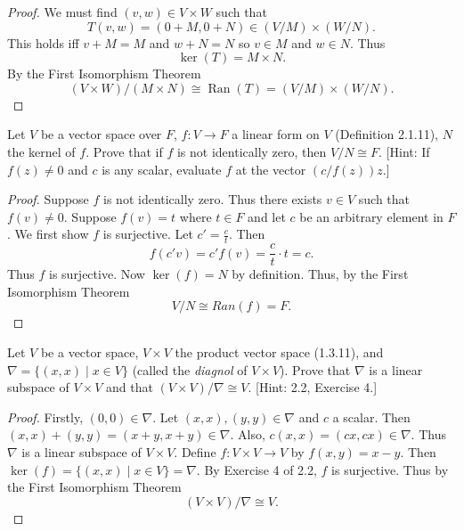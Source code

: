 \begin{proof}
    We must find $(v, w) \in V \times W$ such that 
    \[
        T(v, w) = (0 + M, 0 + N) \in (V / M) \times (W / N).
    \]
    This holds iff $v + M = M$ and $w + N = N$ so
    $v \in M$ and $w \in N$. Thus
    \[
        \ker(T) = M \times N.
    \]
    By the First Isomorphism Theorem
    \[
        (V \times W) / (M \times N) \cong \operatorname{Ran}(T) = (V / M) \times (W / N).
    \]
\end{proof}


\begin{tcolorbox}[title=Problem 3, breakable]
    Let $V$ be a vector space over $F$, $f : V \longrightarrow F$ a linear form on $V$ (Definition 2.1.11),
    $N$ the kernel of $f$. Prove that if $f$ is not identically zero, then $V / N \cong F$.
    [Hint: If $f(z) \ne 0$ and $c$ is any scalar, evaluate $f$ at the vector $(c / f(z))z$.]
\end{tcolorbox}

\begin{proof}
    Suppose $f$ is not identically zero.
    Thus there exists $v \in V$ such that $f(v) \ne 0$.
    Suppose $f(v) = t$ where $t \in F$ and let $c$ be an arbitrary element in $F$.
    We first show $f$ is surjective.
    Let $c' = \frac{c}{t}$. Then
    \[
        f(c'v) = c' f(v) = \frac{c}{t} \cdot t = c.
    \]
    Thus $f$ is surjective.
    Now $\ker(f) = N$ by definition. Thus, by the First Isomorphism Theorem
    \[
        V/N \cong Ran(f) = F.
    \]
\end{proof}

\begin{tcolorbox}[title=Problem 4, breakable]
    Let $V$ be a vector space, $V \times V$ the product vector space (1.3.11),
    and $\nabla = \{(x, x) \mid x \in V\}$ (called the \emph{diagnol} of $V \times V$).
    Prove that $\nabla$ is a linear subspace of $V \times V$ and that $(V \times V)/\nabla \cong V$.
    [Hint: 2.2, Exercise 4.]
\end{tcolorbox}

\begin{proof}
    Firstly, $(0, 0) \in \nabla$.
    Let $(x, x), (y, y) \in \nabla$ and $c$ a scalar.
    Then $(x, x) + (y, y) = (x + y, x + y) \in \nabla$.
    Also, $c(x, x) = (cx, cx) \in \nabla$.
    Thus $\nabla$ is a linear subspace of $V \times V$.
    Define $f : V \times V \to V$ by $f(x,y) = x - y$.
    Then $\ker(f) = \{(x,x) \mid x \in V\} = \nabla$.
    By Exercise 4 of 2.2, $f$ is surjective. Thus by the First Isomorphism Theorem
    \[
        (V \times V)/\nabla \cong V.
    \]
\end{proof}


